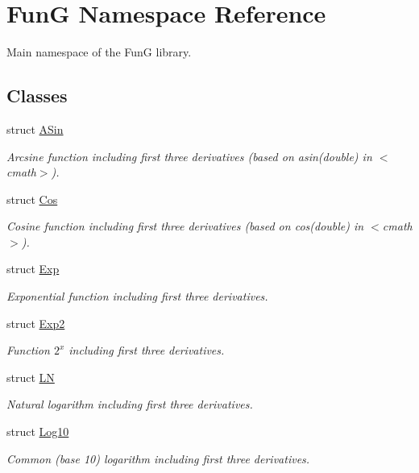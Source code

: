 \hypertarget{namespaceFunG}{\section{Fun\-G Namespace Reference}
\label{namespaceFunG}
}


Main namespace of the Fun\-G library.  


\subsection*{Classes}
\begin{DoxyCompactItemize}
\item 
struct \hyperlink{structFunG_1_1ASin}{A\-Sin}
\begin{DoxyCompactList}\small\item\em Arcsine function including first three derivatives (based on asin(double) in $<$cmath$>$). \end{DoxyCompactList}\item 
struct \hyperlink{structFunG_1_1Cos}{Cos}
\begin{DoxyCompactList}\small\item\em Cosine function including first three derivatives (based on cos(double) in $<$cmath$>$). \end{DoxyCompactList}\item 
struct \hyperlink{structFunG_1_1Exp}{Exp}
\begin{DoxyCompactList}\small\item\em Exponential function including first three derivatives. \end{DoxyCompactList}\item 
struct \hyperlink{structFunG_1_1Exp2}{Exp2}
\begin{DoxyCompactList}\small\item\em Function $2^x$ including first three derivatives. \end{DoxyCompactList}\item 
struct \hyperlink{structFunG_1_1LN}{L\-N}
\begin{DoxyCompactList}\small\item\em Natural logarithm including first three derivatives. \end{DoxyCompactList}\item 
struct \hyperlink{structFunG_1_1Log10}{Log10}
\begin{DoxyCompactList}\small\item\em Common (base 10) logarithm including first three derivatives. \end{DoxyCompactList}\item 

\end{DoxyCompactItemize}
